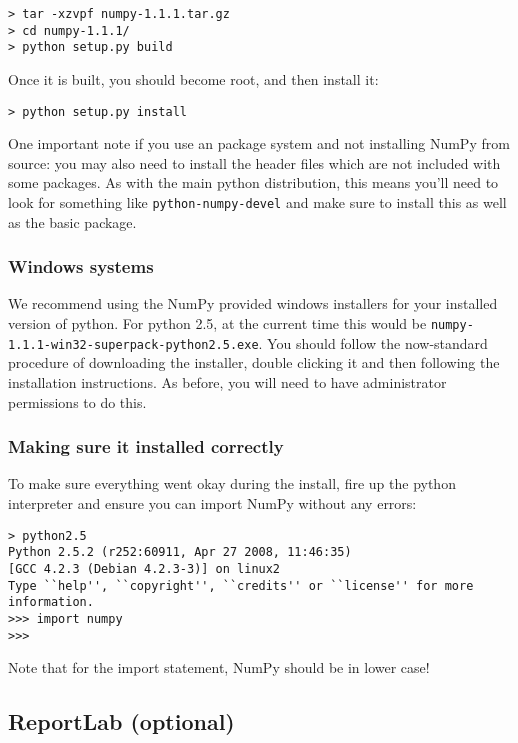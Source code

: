\documentclass{article}
\begin{document}
\begin{verbatim}
> tar -xzvpf numpy-1.1.1.tar.gz
> cd numpy-1.1.1/
> python setup.py build
\end{verbatim}

Once it is built, you should become root, and then install it:

\begin{verbatim}
> python setup.py install
\end{verbatim}

One important note if you use an package system and not installing
NumPy from source: you may also need to
install the header files which are not included with some
packages. As with the main python distribution, this means
you'll need to look for something like \verb|python-numpy-devel| 
and make sure to install this as well as the basic package.

\subsubsection{Windows systems}

We recommend using the NumPy provided windows installers for your installed
version of python. For python 2.5, at the current time this would be
\verb|numpy-1.1.1-win32-superpack-python2.5.exe|. You should follow the 
now-standard procedure of downloading the installer, double
clicking it and then following the installation instructions. As before,
you will need to have administrator permissions to do this.

\subsubsection{Making sure it installed correctly}

To make sure everything went okay during the install, fire up the python
interpreter and ensure you can import NumPy without any errors:

\begin{verbatim}
> python2.5
Python 2.5.2 (r252:60911, Apr 27 2008, 11:46:35) 
[GCC 4.2.3 (Debian 4.2.3-3)] on linux2
Type ``help'', ``copyright'', ``credits'' or ``license'' for more information.
>>> import numpy
>>>
\end{verbatim}

Note that for the import statement, NumPy should be in lower case!

\subsection{ReportLab (optional)}
\end{document}
